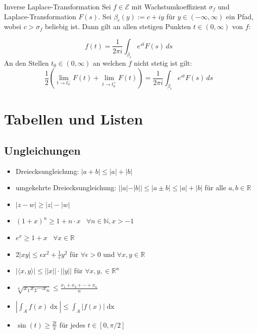 \documentclass[a4paper,10pt]{article}
\def\R{\mathbb{R}}
\begin{document}
\begin{mainbox}{Inverse Laplace-Transformation}
  Sei \(f\in\mathcal{E}\) mit Wachstumkoeffizient \(\sigma_f\) und Laplace-Transformation \(F(s)\). Sei \(\beta_c( y):=c+ i y\) für \(y\in(-\infty,\infty)\) ein Pfad, wobei \(c>\sigma_f\) beliebig ist. Dann gilt an allen stetigen Punkten \(t\in(0,\infty)\) von \(f\):
  
  \begin{equation*} f(t) =\frac{1}{2\pi i}\int_{\beta_c} e^{st}F(s)\,ds \end{equation*} An den Stellen \(t_0\in(0,\infty)\) an welchen $f$ nicht stetig ist gilt: \begin{equation*} \frac12\left(\lim_{t\to t_0^-}F(t)+\lim_{t\to t_0^+}F(t)\right) =\frac{1}{2\pi i}\int_{\beta_c} e^{st}F(s)\,ds \end{equation*}

\end{mainbox}

\section{Tabellen und Listen}

\subsection{Ungleichungen}

\begin{itemize}
  \item Dreiecksungleichung: $|a + b| \leq |a| + |b|$
  \item umgekehrte Dreiecksungleichung: $||a| - |b|| \leq |a \pm b| \leq |a| + |b|$ für alle $a,b \in \R$
  \item $|z - w| \geq |z| - |w|$
  \item $(1+x)^n \geq 1+ n\cdot x$ \, $\forall n\in \mathbb{N}, x > -1$
  \item $e^x \geq 1 + x$ \, $\forall x\in \mathbb{R}$
  \item $2|xy| \leq \epsilon x^2 + \frac{1}{\epsilon} y^2$ für $\forall \epsilon > 0$ und $\forall x,y \in \mathbb{R}$
  \item $|\langle x,y \rangle| \leq ||x|| \cdot ||y||$ für $\forall x,y, \in \mathbb{R}^n$
  \item $\sqrt[n]{x_1 x_2 \cdots x_n} \leq \frac{x_1 + x_2 + \cdots + x_n}{n}$
  \item $\left| \int_A f(x) \mathop{dx}\right| \le \int_A \left|f(x)\right| \mathop{dx}$
  \item $\sin(t) \geq \frac{2t}{\pi}$ für jedes $t \in [0, \pi/2]$
\end{itemize}
\end{document}
